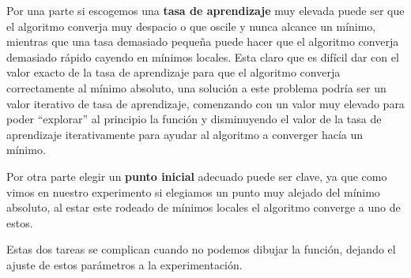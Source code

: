 \documentclass[size=a4, parskip=half, titlepage=false, toc=flat, toc=bib, 12pt]{scrartcl}
\begin{document}
\begin{enumerate}
Por una parte si escogemos una \textbf{tasa de aprendizaje} muy elevada puede ser que el algoritmo converja
muy despacio o que oscile y nunca alcance un mínimo, mientras que una tasa demasiado pequeña puede hacer
que el algoritmo converja demasiado rápido cayendo en mínimos locales. Esta claro que es difícil dar con
el valor exacto de la tasa de aprendizaje para que el algoritmo converja correctamente al mínimo absoluto,
una solución a este problema podría ser un valor iterativo de tasa de aprendizaje, comenzando con un valor
muy elevado para poder ``explorar'' al principio la función y disminuyendo el valor de la tasa de aprendizaje
iterativamente para ayudar al algoritmo a converger hacía un mínimo.

Por otra parte elegir un \textbf{punto inicial} adecuado puede ser clave, ya que como vimos en nuestro experimento
si elegiamos un punto muy alejado del mínimo absoluto, al estar este rodeado de mínimos locales el algoritmo
converge a uno de estos.

Estas dos tareas se complican cuando no podemos dibujar la función, dejando el ajuste de estos parámetros
a la experimentación.
\end{enumerate}
\end{document}
